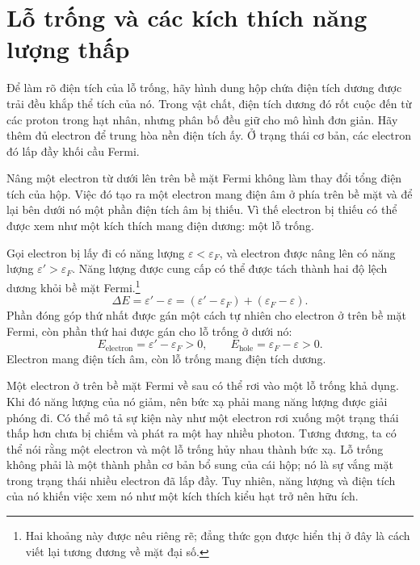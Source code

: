 \section{Lỗ trống và các kích thích năng lượng thấp}

Để làm rõ điện tích của lỗ trống, hãy hình dung hộp chứa điện tích dương được trải đều khắp thể tích của nó. Trong vật chất, điện tích dương đó rốt cuộc đến từ các proton trong hạt nhân, nhưng phân bố đều giữ cho mô hình đơn giản. Hãy thêm đủ electron để trung hòa nền điện tích ấy. Ở trạng thái cơ bản, các electron đó lấp đầy khối cầu Fermi.

Nâng một electron từ dưới lên trên bề mặt Fermi không làm thay đổi tổng điện tích của hộp. Việc đó tạo ra một electron mang điện âm ở phía trên bề mặt và để lại bên dưới nó một phần điện tích âm bị thiếu. Vì thế electron bị thiếu có thể được xem như một kích thích mang điện dương: một lỗ trống.

\begin{classroomqa}
\end{classroomqa}

Gọi electron bị lấy đi có năng lượng \(\varepsilon<\varepsilon_F\), và electron được nâng lên có năng lượng \(\varepsilon'>\varepsilon_F\). Năng lượng được cung cấp có thể được tách thành hai độ lệch dương khỏi bề mặt Fermi.\footnote{Hai khoảng này được nêu riêng rẽ; đẳng thức gọn được hiển thị ở đây là cách viết lại tương đương về mặt đại số.}
\begin{equation}
\Delta E
=\varepsilon'-\varepsilon
=(\varepsilon'-\varepsilon_F)+(\varepsilon_F-\varepsilon).
\end{equation}
Phần đóng góp thứ nhất được gán một cách tự nhiên cho electron ở trên bề mặt Fermi, còn phần thứ hai được gán cho lỗ trống ở dưới nó:
\begin{equation}
E_{\mathrm{electron}}=\varepsilon'-\varepsilon_F>0,
\qquad
E_{\mathrm{hole}}=\varepsilon_F-\varepsilon>0.
\end{equation}
Electron mang điện tích âm, còn lỗ trống mang điện tích dương.

Một electron ở trên bề mặt Fermi về sau có thể rơi vào một lỗ trống khả dụng. Khi đó năng lượng của nó giảm, nên bức xạ phải mang năng lượng được giải phóng đi. Có thể mô tả sự kiện này như một electron rơi xuống một trạng thái thấp hơn chưa bị chiếm và phát ra một hay nhiều photon. Tương đương, ta có thể nói rằng một electron và một lỗ trống hủy nhau thành bức xạ. Lỗ trống không phải là một thành phần cơ bản bổ sung của cái hộp; nó là sự vắng mặt trong trạng thái nhiều electron đã lấp đầy. Tuy nhiên, năng lượng và điện tích của nó khiến việc xem nó như một kích thích kiểu hạt trở nên hữu ích.

